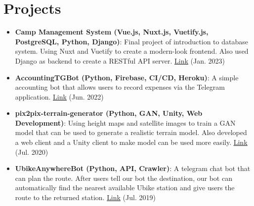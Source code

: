 \documentclass[a4paper8pt]{extarticle}
\newcommand{\resumeItem}[2]{
  \item\small{
    \textbf{#1}{: #2 \vspace{-2pt}}
  }
}
\newcommand{\resumeSubItem}[2]{\resumeItem{#1}{#2}\vspace{-3pt}}
\newcommand{\resumeSubHeadingListStart}{\begin{itemize}[leftmargin=*]}
\newcommand{\resumeSubHeadingListEnd}{\end{itemize}}
\begin{document}
\vspace{-5pt}
\section{Projects}
\resumeSubHeadingListStart
\resumeSubItem{Camp Management System (Vue.js, Nuxt.js, Vuetify.js, PostgreSQL, Python, Django)}{Final project of introduction to database system. Using Nuxt and Vuetify to create a modern-look frontend. Also used Django as backend to create a RESTful API server. \href{https://github.com/jayin92/camp-management-system}{\underline{Link}} (Jan. 2023)}
\resumeSubItem{AccountingTGBot (Python, Firebase, CI/CD, Heroku)}{A simple accounting bot that allows users to record expenses via the Telegram application. \href{https://github.com/jayin92/AccountingTGBot}{\underline{Link}} (Jun. 2022)}
\vspace{2pt}
\resumeSubItem{pix2pix-terrain-generator (Python, GAN, Unity, Web Development)}{Using height maps and satellite images to train a GAN model that can be used to generate a realistic terrain model. Also developed a web client and a Unity client to make model can be used more easily. \href{https://github.com/jayin92/pix2pix-terrain-generator}{\underline{Link}} (Jul. 2020)}
\vspace{2pt}
\resumeSubItem{UbikeAnywhereBot (Python, API, Crawler)}{A telegram chat bot that can plan the route. After users tell our bot the destination, our bot can automatically find the nearest available Ubike station and give users the route to the returned station. \href{https://github.com/jayin92/UBikeAnywhereBot}{\underline{Link}} (Jul. 2019)}
\resumeSubHeadingListEnd
\vspace{-5pt}

\end{document}
